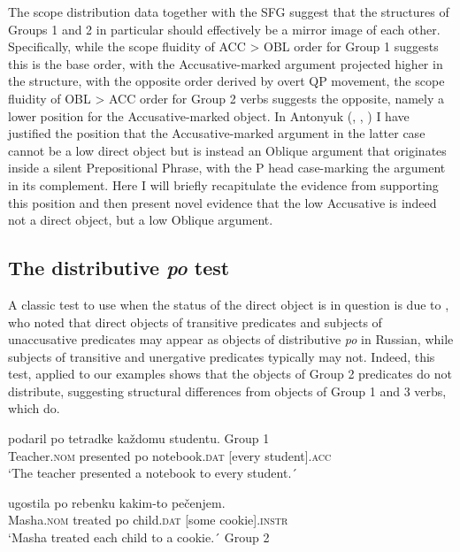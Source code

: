 \documentclass[output=paper,colorlinks,citecolor=brown,nonflat]{./langscibook}
\begin{document}
The scope distribution data together with the SFG suggest that the structures of Groups 1 and 2 in particular should effectively be a mirror image of each other. Specifically, while the scope fluidity of ACC > OBL order for Group 1 suggests this is the base order, with the Accusative-marked argument projected higher in the structure, with the opposite order derived by overt QP movement, the scope fluidity of OBL > ACC order for Group 2 verbs suggests the opposite, namely a lower position for the Accusative-marked object. In Antonyuk (\citeyear{Antonyuk2015}, \citeyear{Antonyuk2017}, \citeyear{Antonyuk2018}) I have justified the position that the Accusative-marked argument in the latter case cannot be a low direct object but is instead an Oblique argument that originates inside a silent Prepositional Phrase, with the P head case-marking the argument in its complement. Here I will briefly recapitulate the evidence from \citet{Antonyuk2015} supporting this position and then present novel evidence that the low Accusative is indeed not a direct object, but a low Oblique argument.

\subsection{The distributive \textit{po} test}\label{sec:antonyuk:3.1}

A classic test to use when the status of the direct object is in question is due to \citet{Pesetsky1982}, who noted that direct objects of transitive predicates and subjects of unaccusative predicates may appear as objects of distributive \textit{po} in Russian, while subjects of transitive and unergative predicates typically may not. Indeed, this test, applied to our examples shows that the objects of Group 2 predicates do not distribute, suggesting structural differences from objects of Group 1 and 3 verbs, which do.


\ea%
    \label{ex:antonyuk:22}
                {podaril}    {po} {tetradke}            {každomu} {studentu}. \hfill{Group 1}\\
    Teacher.\textsc{nom} presented po notebook.\textsc{dat} [every      student].\textsc{acc}\\
    \glt `The teacher presented a notebook to every student.´
    \z

\ea%
    \label{ex:antonyuk:23}
                {ugostila} {po} {rebenku}     {kakim-to} {pečenjem}.\\
    Masha.\textsc{nom} treated   po child.\textsc{dat} [some       cookie].\textsc{instr}\\
    \glt `Masha treated each child to a cookie.´ \hfill{Group 2}
    \z
\end{document}
